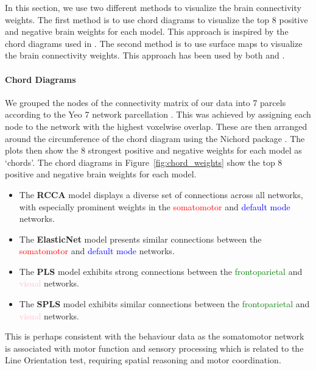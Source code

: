 In this section, we use two different methods to visualize the brain connectivity weights.
The first method is to use chord diagrams to visualize the top 8 positive and negative brain \gls{weights} for each model.
This approach is inspired by the chord diagrams used in \cite{smith2015positive}.
The second method is to use surface maps to visualize the brain connectivity weights.
This approach has been used by both \cite{ferreira2022hierarchical} and \cite{smith2015positive}.

\paragraph{Chord Diagrams}
We grouped the nodes of the connectivity matrix of our data into 7 parcels according to the Yeo 7 network parcellation \cite{yeo2011organization}.
This was achieved by assigning each node to the network with the highest voxelwise overlap.
These are then arranged around the circumference of the chord diagram using the Nichord package \citep{bogdan2023connsearch}.
The plots then show the 8 strongest positive and negative \gls{weights} for each model as `chords'.
The chord diagrams in Figure~\ref{fig:chord_weights} show the top 8 positive and negative brain \gls{weights} for each model.

\begin{itemize}
    \item The \textbf{RCCA} model displays a diverse set of connections across all networks, with especially prominent weights in the \textcolor{red}{somatomotor} and \textcolor{blue}{default mode} networks.

    \item The \textbf{ElasticNet} model presents similar connections between the \textcolor{red}{somatomotor} and \textcolor{blue}{default mode} networks.

    \item The \textbf{PLS} model exhibits strong connections between the \textcolor{green}{frontoparietal} and \textcolor{pink}{visual} networks.

    \item The \textbf{SPLS} model exhibits similar connections between the \textcolor{green}{frontoparietal} and \textcolor{pink}{visual} networks.
\end{itemize}

This is perhaps consistent with the behaviour data as the somatomotor network is associated with motor function and sensory processing which is related to the Line Orientation test, requiring spatial reasoning and motor coordination.

